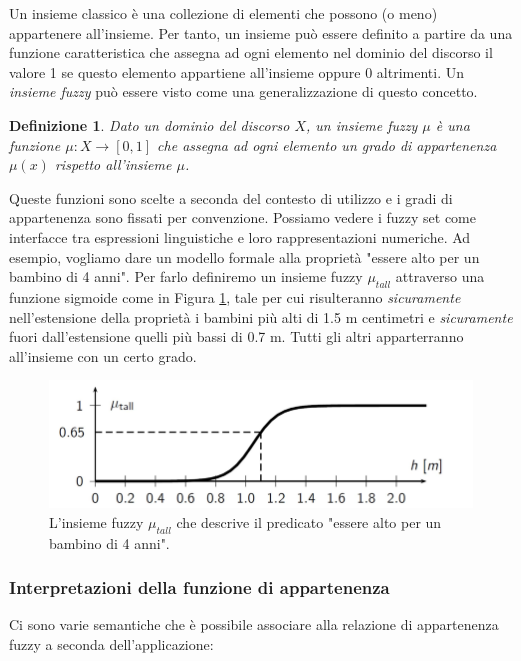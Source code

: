 \documentclass[10pt,a4paper]{article}
\newtheorem{definition}{Definizione}
\begin{document}
Un insieme classico è una collezione di elementi che possono (o meno) appartenere all'insieme. Per tanto, un insieme può essere definito a partire da una funzione caratteristica che assegna ad ogni elemento nel dominio del discorso il valore 1 se questo elemento appartiene all'insieme oppure 0 altrimenti. Un 	\emph{insieme fuzzy} può essere visto come una generalizzazione di questo concetto.
\begin{definition}
 Dato un dominio del discorso $X$, un insieme fuzzy $\mu$ è una funzione $\mu : X \to [0,1]$ che assegna ad ogni elemento un \emph{grado di appartenenza} $\mu(x)$ rispetto all'insieme $\mu$.
\end{definition}
 Queste funzioni sono scelte a seconda del contesto di utilizzo e i gradi di appartenenza sono fissati per convenzione. Possiamo vedere i fuzzy set come interfacce tra espressioni linguistiche e loro rappresentazioni numeriche. Ad esempio, vogliamo dare un modello formale alla proprietà "essere alto per un bambino di 4 anni". Per farlo definiremo un insieme fuzzy $\mu_{tall}$ attraverso una funzione sigmoide come in Figura \ref{fig:23}, tale per cui risulteranno \emph{sicuramente} nell'estensione della proprietà i bambini più alti di 1.5 m centimetri e \emph{sicuramente} fuori dall'estensione quelli più bassi di 0.7 m. Tutti gli altri apparterranno all'insieme con un certo grado.

\begin{figure}
\centering
\includegraphics[scale=0.3]{img/tall.png}
\caption{L'insieme fuzzy $\mu_{tall}$ che descrive il predicato "essere alto per un bambino di 4 anni".}
\label{fig:23}
\end{figure}

\subsubsection{Interpretazioni della funzione di appartenenza}

Ci sono varie semantiche che è possibile associare alla relazione di appartenenza fuzzy a seconda dell'applicazione:
\end{document}

